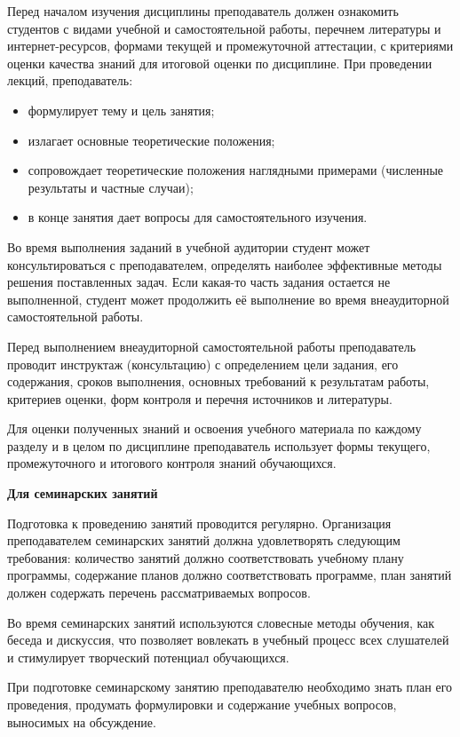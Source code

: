 \documentclass[a4paper, 12pt]{article}
\begin{document}
Перед началом изучения дисциплины преподаватель должен ознакомить студентов с видами учебной и самостоятельной работы, перечнем литературы и интернет-ресурсов, формами текущей и промежуточной аттестации, с критериями оценки качества знаний для итоговой оценки по дисциплине. 
При проведении лекций, преподаватель:
\begin{itemize}[noitemsep,topsep=0pt]
    \item формулирует тему и цель занятия;
    \item излагает основные теоретические положения;
    \item сопровождает теоретические положения наглядными примерами (численные результаты и частные случаи);
    \item в конце занятия дает вопросы для самостоятельного изучения.
\end{itemize}

Во время выполнения заданий в учебной аудитории студент может консультироваться с преподавателем, определять наиболее эффективные методы решения поставленных задач. Если какая-то часть задания остается не выполненной, студент может продолжить её выполнение во время внеаудиторной самостоятельной работы.

Перед выполнением внеаудиторной самостоятельной работы преподаватель проводит инструктаж (консультацию) с определением цели задания, его содержания, сроков выполнения, основных требований к результатам работы, критериев оценки, форм контроля и перечня источников и литературы.

Для оценки полученных знаний и освоения учебного материала по каждому разделу и в целом по дисциплине преподаватель использует формы текущего, промежуточного и итогового контроля знаний обучающихся.

\vspace{8pt}
{\bf Для семинарских занятий}

Подготовка к проведению занятий проводится регулярно. Организация преподавателем семинарских занятий должна удовлетворять следующим требования: количество занятий должно соответствовать учебному плану программы, содержание планов должно соответствовать программе, план занятий должен содержать перечень рассматриваемых вопросов.

Во время семинарских занятий используются словесные методы обучения, как беседа и дискуссия, что позволяет вовлекать в учебный процесс всех слушателей и стимулирует творческий потенциал обучающихся. 

При подготовке семинарскому занятию преподавателю необходимо знать план его проведения, продумать формулировки и содержание учебных вопросов, выносимых на обсуждение. 
\end{document}
